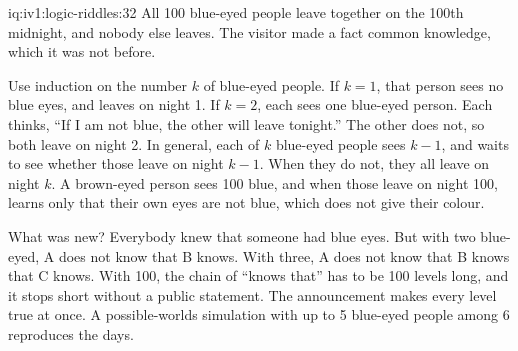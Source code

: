 \begin{solution}{iq:iv1:logic-riddles:32}
All 100 blue-eyed people leave together on the 100th midnight, and nobody else leaves. The visitor made a fact common knowledge, which it was not before.

Use induction on the number $k$ of blue-eyed people. If $k = 1$, that person sees no blue eyes, and leaves on night 1. If $k = 2$, each sees one blue-eyed person. Each thinks, ``If I am not blue, the other will leave tonight.'' The other does not, so both leave on night 2. In general, each of $k$ blue-eyed people sees $k - 1$, and waits to see whether those leave on night $k - 1$. When they do not, they all leave on night $k$. A brown-eyed person sees 100 blue, and when those leave on night 100, learns only that their own eyes are not blue, which does not give their colour.

What was new? Everybody knew that someone had blue eyes. But with two blue-eyed, A does not know that B knows. With three, A does not know that B knows that C knows. With 100, the chain of ``knows that'' has to be 100 levels long, and it stops short without a public statement. The announcement makes every level true at once. A possible-worlds simulation with up to 5 blue-eyed people among 6 reproduces the days.

\end{solution}

